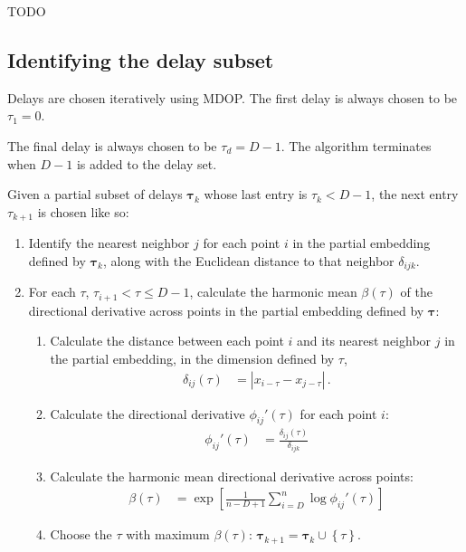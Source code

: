 \documentclass[10pt]{article}
\newcommand{\btau}{\boldsymbol{\tau}}
\begin{document}
TODO

\subsection{Identifying the delay subset}

Delays are chosen iteratively using MDOP. The first delay is always chosen to be $\tau_1 = 0$.

The final delay is always chosen to be $\tau_d = D - 1$. The algorithm terminates when $D - 1$ is added to the delay set.

Given a partial subset of delays $\btau_k$ whose last entry is $\tau_k < D - 1$, the next entry $\tau_{k+1}$ is chosen like so:

\begin{enumerate}

\item Identify the nearest neighbor $j$ for each point $i$ in the partial embedding defined by $\btau_k$, along with the Euclidean distance to that neighbor $\delta_{ijk}$.

\item For each $\tau$, $\tau_{i + 1} < \tau \leq D - 1$, calculate the harmonic mean $\beta(\tau)$ of the directional derivative across points in the partial embedding defined by $\btau$:
    
    \begin{enumerate}
    
    \item Calculate the distance between each point $i$ and its nearest neighbor $j$ in the partial embedding, in the dimension defined by $\tau$,
    \begin{align}
    \delta_{ij}(\tau) &= | x_{i - \tau} - x_{j - \tau} | \, .
    \end{align}
    \item Calculate the directional derivative $\phi_{ij}'(\tau)$ for each point $i$:
    \begin{align}
    \phi_{ij}'(\tau) &= \frac{\delta_{ij}(\tau)}{\delta_{ijk}}
    \end{align}
    \item Calculate the harmonic mean directional derivative across points:
    \begin{align}
    \beta(\tau) &= \exp \left[
        \frac{1}{n - D + 1}
        \sum_{i=D}^n \log \phi_{ij}'(\tau)
    \right]
    \end{align}
    \item Choose the $\tau$ with maximum $\beta(\tau)$: $\btau_{k+1} = \btau_k \cup \left\{ \tau \right\}$.
    
    
    \end{enumerate}

\end{enumerate}
\end{document}

